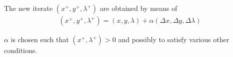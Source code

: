 The new iterate $(x^+,y^+,\lambda^+)$ are obtained by means of
\begin{equation*}
	\begin{aligned}
		(x^+,y^+,\lambda^+) = (x,y,\lambda) + \alpha (\Delta x, \Delta y, \Delta \lambda )
	\end{aligned}
\end{equation*}

$\alpha$ is chosen such that $(x^+,\lambda^+)>0$ and possibly to satisfy various other conditions.












































